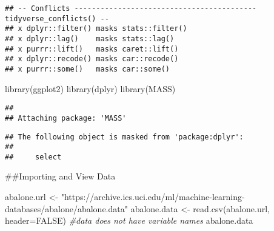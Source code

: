 \documentclass[
]{article}
\newenvironment{Shaded}{\begin{snugshade}}{\end{snugshade}}
\newcommand{\AttributeTok}[1]{\textcolor[rgb]{0.77,0.63,0.00}{#1}}
\newcommand{\CommentTok}[1]{\textcolor[rgb]{0.56,0.35,0.01}{\textit{#1}}}
\newcommand{\ConstantTok}[1]{\textcolor[rgb]{0.00,0.00,0.00}{#1}}
\newcommand{\FunctionTok}[1]{\textcolor[rgb]{0.00,0.00,0.00}{#1}}
\newcommand{\NormalTok}[1]{#1}
\newcommand{\OtherTok}[1]{\textcolor[rgb]{0.56,0.35,0.01}{#1}}
\newcommand{\StringTok}[1]{\textcolor[rgb]{0.31,0.60,0.02}{#1}}
\begin{document}
\begin{verbatim}
## -- Conflicts ------------------------------------------ tidyverse_conflicts() --
## x dplyr::filter() masks stats::filter()
## x dplyr::lag()    masks stats::lag()
## x purrr::lift()   masks caret::lift()
## x dplyr::recode() masks car::recode()
## x purrr::some()   masks car::some()
\end{verbatim}

\begin{Shaded}
\begin{Highlighting}[]
\FunctionTok{library}\NormalTok{(ggplot2)}
\FunctionTok{library}\NormalTok{(dplyr)}
\FunctionTok{library}\NormalTok{(MASS)}
\end{Highlighting}
\end{Shaded}

\begin{verbatim}
## 
## Attaching package: 'MASS'
\end{verbatim}

\begin{verbatim}
## The following object is masked from 'package:dplyr':
## 
##     select
\end{verbatim}

\#\#Importing and View Data

\begin{Shaded}
\begin{Highlighting}[]
\NormalTok{abalone.url }\OtherTok{\textless{}{-}}
  \StringTok{"https://archive.ics.uci.edu/ml/machine{-}learning{-}databases/abalone/abalone.data"}
\NormalTok{abalone.data }\OtherTok{\textless{}{-}} \FunctionTok{read.csv}\NormalTok{(abalone.url, }\AttributeTok{header=}\ConstantTok{FALSE}\NormalTok{) }\CommentTok{\#data does not have variable names}
\NormalTok{abalone.data}
\end{Highlighting}
\end{Shaded}
\end{document}

